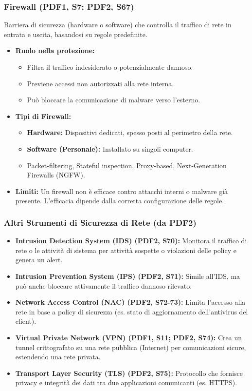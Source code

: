 \documentclass{beamer}
\begin{document}
\begin{frame}
  \frametitle{Firewall (PDF1, S7; PDF2, S67)}
  Barriera di sicurezza (hardware o software) che controlla il traffico di rete in entrata e uscita, basandosi su regole predefinite.
  \begin{itemize}
    \item \textbf{Ruolo nella protezione:}
    \begin{itemize}
        \item Filtra il traffico indesiderato o potenzialmente dannoso.
        \item Previene accessi non autorizzati alla rete interna.
        \item Può bloccare la comunicazione di malware verso l'esterno.
    \end{itemize}
    \item \textbf{Tipi di Firewall:}
    \begin{itemize}
        \item \textbf{Hardware:} Dispositivi dedicati, spesso posti al perimetro della rete.
        \item \textbf{Software (Personale):} Installato su singoli computer.
        \item Packet-filtering, Stateful inspection, Proxy-based, Next-Generation Firewalls (NGFW).
    \end{itemize}
    \item \textbf{Limiti:} Un firewall non è efficace contro attacchi interni o malware già presente. L'efficacia dipende dalla corretta configurazione delle regole.
  \end{itemize}
\end{frame}

\begin{frame}
    \frametitle{Altri Strumenti di Sicurezza di Rete (da PDF2)}
    \begin{itemize}
        \item \textbf{Intrusion Detection System (IDS) (PDF2, S70):} Monitora il traffico di rete o le attività di sistema per attività sospette o violazioni delle policy e genera un alert.
        \item \textbf{Intrusion Prevention System (IPS) (PDF2, S71):} Simile all'IDS, ma può anche bloccare attivamente il traffico dannoso rilevato.
        \item \textbf{Network Access Control (NAC) (PDF2, S72-73):} Limita l'accesso alla rete in base a policy di sicurezza (es. stato di aggiornamento dell'antivirus del client).
        \item \textbf{Virtual Private Network (VPN) (PDF1, S11; PDF2, S74):} Crea un tunnel crittografato su una rete pubblica (Internet) per comunicazioni sicure, estendendo una rete privata.
        \item \textbf{Transport Layer Security (TLS) (PDF2, S75):} Protocollo che fornisce privacy e integrità dei dati tra due applicazioni comunicanti (es. HTTPS).
    \end{itemize}
\end{frame}
\end{document}
